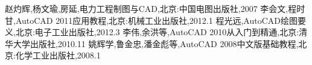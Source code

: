 \begin{thebibliography}{99}
 赵灼辉,杨文瑜,房延,电力工程制图与CAD,北京:中国电图出版社,2007
李会文,程时甘,AutoCAD 2011应用教程,北京:机械工业出版社,2012.1
程光远,AutoCAD绘图要义,北京:电子工业出版社,2012.3
李伟,余洪等,AutoCAD 2010从入门到精通,北京:清华大学出版社,2010.11
姚辉学,鲁金忠,潘金彪等,AutoCAD 2008中文版基础教程,北京:化学工业出版社,2008.1
\end{thebibliography}
\endinput
